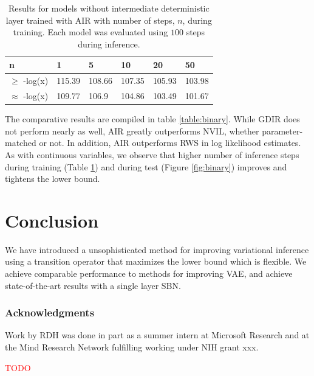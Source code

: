 \documentclass{article} %
\newcommand{\alert}[1]{\textcolor{red}{#1}}
\begin{document}
\begin{table}
\begin{tabular}{ | m{1.4cm} | m{1cm} | m{1cm} | m{1cm} | m{1cm} | m{1cm} |}
\hline
n & 1 & 5 & 10 & 20 & 50 \\
\hline
$\ge$ -log(x) & 115.39 & 108.66 & 107.35 & 105.93 & 103.98 \\
\hline
$\approx$ -log(x) & 109.77 & 106.9 & 104.86 & 103.49 & 101.67 \\
\hline
\end{tabular}
\caption{Results for models without intermediate deterministic layer trained with AIR with number of steps, $n$, during training. Each model was evaluated using $100$ steps during inference.}
\label{table:binary_step}
\end{table}

The comparative results are compiled in table \ref{table:binary}. While GDIR does not perform nearly as well, AIR greatly outperforms NVIL, whether parameter-matched or not. In addition, AIR outperforms RWS in log likelihood estimates. As with continuous variables, we observe that higher number of inference steps during training (Table \ref{table:binary_step}) and during test (Figure \ref{fig:binary}) improves and tightens the lower bound.

\section{Conclusion}
We have introduced a unsophisticated method for improving variational inference using a transition operator that maximizes the lower bound which is flexible. We achieve comparable performance to methods for improving VAE, and achieve state-of-the-art results with a single layer SBN.

\subsubsection*{Acknowledgments}
Work by RDH was done in part as a summer intern at Microsoft Research and at the Mind Research Network fulfilling working under NIH grant xxx.

\alert{TODO}




\end{document}
